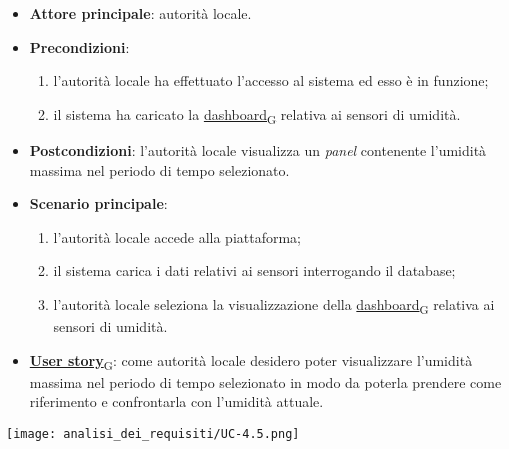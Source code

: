 \begin{itemize}
	\item \textbf{Attore principale}: autorità locale.
	\item \textbf{Precondizioni}:
	      \begin{enumerate}
		      \item l'autorità locale ha effettuato l'accesso al sistema ed esso è in funzione;
		      \item il sistema ha caricato la \href{https://7last.github.io/docs/rtb/documentazione-interna/glossario\#dashboard}{dashboard\textsubscript{G}} relativa ai sensori di umidità.
	      \end{enumerate}
	\item \textbf{Postcondizioni}: l'autorità locale visualizza un \textit{panel} contenente l'umidità massima nel periodo di tempo selezionato.
	\item \textbf{Scenario principale}:
	      \begin{enumerate}
		      \item l'autorità locale accede alla piattaforma;
		      \item il sistema carica i dati relativi ai sensori interrogando il database;
		      \item l'autorità locale seleziona la visualizzazione della \href{https://7last.github.io/docs/rtb/documentazione-interna/glossario\#dashboard}{dashboard\textsubscript{G}} relativa ai sensori di umidità.
	      \end{enumerate}
	\item \href{https://7last.github.io/docs/rtb/documentazione-interna/glossario\#user-story}{\textbf{User story}\textsubscript{G}}:
	      come autorità locale desidero poter visualizzare l'umidità massima nel periodo di tempo selezionato
	      in modo da poterla prendere come riferimento e confrontarla con l'umidità attuale.
\end{itemize}
\begin{center}
	\texttt{[image: analisi\_dei\_requisiti/UC-4.5.png]}
\end{center}

\newpage

